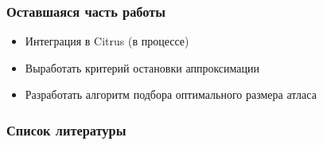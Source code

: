 \documentclass[10pt, unicode]{beamer}
\begin{document}
    \begin{frame}
        \frametitle{Оставшаяся часть работы}
        \begin{itemize}
            \item Интеграция в Citrus (в процессе)
            \item Выработать критерий остановки аппроксимации
            \item Разработать алгоритм подбора оптимального размера атласа
        \end{itemize}
    \end{frame}
    \begin{frame} %
        \frametitle{Список литературы}
        
        
    \end{frame}
\end{document}
